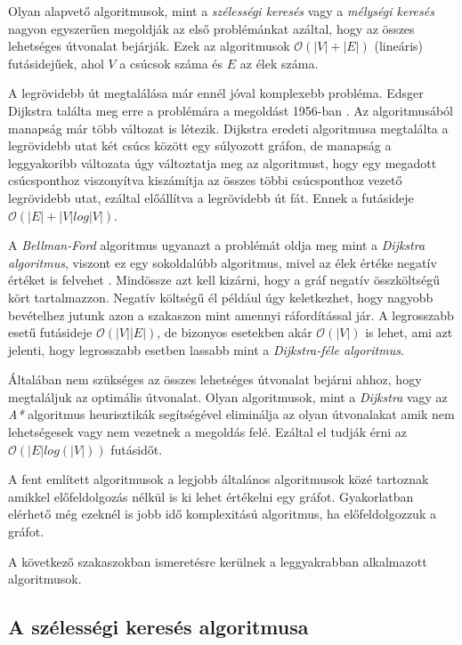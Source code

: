 Olyan alapvető algoritmusok, mint a \textit{szélességi
keresés} vagy a \textit{mélységi keresés} nagyon egyszerűen megoldják az első problémánkat azáltal, hogy az összes lehetséges útvonalat bejárják. Ezek az algoritmusok $\mathcal{O}(|V| + |E|)$ (lineáris) futásidejűek, ahol $V$ a csúcsok száma és $E$ az élek száma.

A legrövidebb út megtalálása már ennél jóval komplexebb probléma. Edsger Dijkstra találta meg erre a problémára a megoldást 1956-ban \cite{Dijkstra}. Az algoritmusából manapság már több változat is létezik. Dijkstra eredeti algoritmusa megtalálta a legrövidebb utat két csúcs között egy súlyozott gráfon, de manapság a leggyakoribb változata úgy változtatja meg az algoritmust, hogy egy megadott csúcsponthoz viszonyítva kiszámítja az összes többi csúcsponthoz vezető legrövidebb utat, ezáltal előállítva a legrövidebb út fát. Ennek a futásideje $\mathcal{O}(|E| + |V| log|V|)$.

A \textit{Bellman-Ford} algoritmus ugyanazt a problémát oldja meg mint a \textit{Dijkstra algoritmus}, viszont ez egy sokoldalúbb algoritmus, mivel az élek értéke negatív értéket is felvehet \cite{bellman}. Mindössze azt kell kizárni, hogy a gráf negatív összköltségű kört tartalmazzon. Negatív költségű él például úgy keletkezhet, hogy nagyobb bevételhez jutunk azon a szakaszon mint amennyi ráfordítással jár. A legrosszabb esetű futásideje $\mathcal{O}(|V||E|)$, de bizonyos esetekben akár $\mathcal{O}(|V|)$ is lehet, ami azt jelenti, hogy legrosszabb esetben lassabb mint a \textit{Dijkstra-féle algoritmus}.

Általában nem szükséges az összes lehetséges útvonalat bejárni ahhoz, hogy megtaláljuk az optimális útvonalat. Olyan algoritmusok, mint a \textit{Dijkstra} vagy az \textit{A*} algoritmus heurisztikák segítségével eliminálja az olyan útvonalakat amik nem lehetségesek vagy nem vezetnek a megoldás felé. Ezáltal el tudják érni az $\mathcal{O}(|E| log(|V|))$ futásidőt. 

A fent említett algoritmusok a legjobb általános algoritmusok közé tartoznak amikkel előfeldolgozás nélkül is ki lehet értékelni egy gráfot. Gyakorlatban elérhető még ezeknél is jobb idő komplexitású algoritmus, ha előfeldolgozzuk a gráfot.

A következő szakaszokban ismeretésre kerülnek a leggyakrabban alkalmazott algoritmusok.

\subsection{A szélességi keresés algoritmusa}
\cite{algoritmusok}
\cite{Pathfinding}
\cite{Breadth-first_search}

